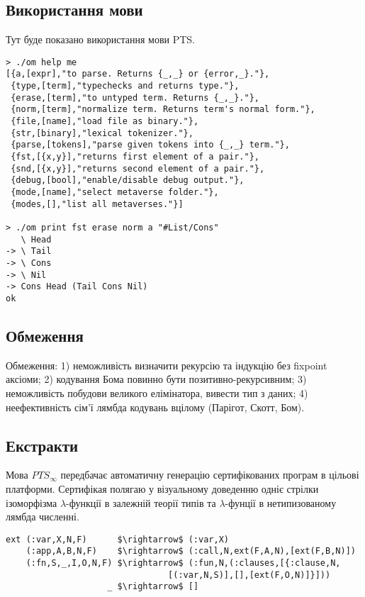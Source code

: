\subsection{Використання мови}
Тут буде показано використання мови PTS.

\begin{lstlisting}
> ./om help me
[{a,[expr],"to parse. Returns {_,_} or {error,_}."},
 {type,[term],"typechecks and returns type."},
 {erase,[term],"to untyped term. Returns {_,_}."},
 {norm,[term],"normalize term. Returns term's normal form."},
 {file,[name],"load file as binary."},
 {str,[binary],"lexical tokenizer."},
 {parse,[tokens],"parse given tokens into {_,_} term."},
 {fst,[{x,y}],"returns first element of a pair."},
 {snd,[{x,y}],"returns second element of a pair."},
 {debug,[bool],"enable/disable debug output."},
 {mode,[name],"select metaverse folder."},
 {modes,[],"list all metaverses."}]

> ./om print fst erase norm a "#List/Cons"
   \ Head
-> \ Tail
-> \ Cons
-> \ Nil
-> Cons Head (Tail Cons Nil)
ok
\end{lstlisting}

\subsection*{Обмеження}
Обмеження:
1) неможливість визначити рекурсію та індукцію без fixpoint аксіоми;
2) кодування Бома повинно бути позитивно-рекурсивним;
3) неможливість побудови великого елімінатора, вивести тип з даних;
4) неефективність сім'ї лямбда кодувань вцілому (Парігот, Скотт, Бом).

\subsection*{Екстракти}
Мова $PTS_\infty$ передбачає автоматичну генерацію сертифікованих програм в цільові платформи.
Сертифікая полягаю у візуальному доведенню одніє стрілки ізоморфізма
$\lambda$-функції в залежній теорії типів та $\lambda$-фунції в нетипизованому лямбда численні.

\begin{lstlisting}[mathescape=true]
ext (:var,X,N,F)      $\rightarrow$ (:var,X)
    (:app,A,B,N,F)    $\rightarrow$ (:call,N,ext(F,A,N),[ext(F,B,N)])
    (:fn,S,_,I,O,N,F) $\rightarrow$ (:fun,N,(:clauses,[{:clause,N,
                                [(:var,N,S)],[],[ext(F,O,N)]}]))
                    _ $\rightarrow$ []
\end{lstlisting}

